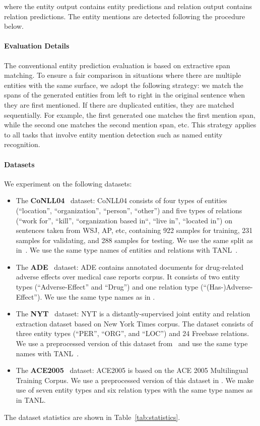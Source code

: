 \noindent where the entity output contains entity predictions and relation output contains relation predictions. The entity mentions are detected following the procedure below.

\paragraph{Evaluation Details} 
The conventional entity prediction evaluation is based on extractive span matching. To ensure a fair comparison in situations where there are multiple entities with the same surface, we adopt the following strategy: we match the spans of the generated entities from left to right in the original sentence when they are first mentioned. If there are duplicated entities, they are matched sequentially. For example, the first generated one matches the first mention span, while the second one matches the second mention span, etc. This strategy applies to all tasks that involve entity mention detection such as named entity recognition.

\paragraph{Datasets}
We experiment on the following datasets:

\begin{itemize}
    \item The {\bf CoNLL04}~\citep{roth-yih-2004-linear} dataset: CoNLL04 consists of four types of entities (``location'', ``organization'', ``person'', ``other'') and five types of relations (``work for'', ``kill'', ``organization based in``, ``live in'', ``located in'') on sentences taken from WSJ, AP, etc, containing 922 samples for training, 231 samples for validating, and 288 samples for testing. We use the same split as in~\cite{gupta-etal-2016-table}. We use the same type names of entities and relations with TANL~\cite{paolini2021structured}.
    \item The {\bf ADE}~\citep{GURULINGAPPA2012885} dataset: ADE contains annotated documents for drug-related adverse effects over medical case reports corpus. It consists of two entity types (``Adverse-Effect'' and ``Drug'') and one relation type (``(Has-)Adverse-Effect''). We use the same type names as in \cite{paolini2021structured}.
    \item The {\bf NYT}~\citep{10.1007/978-3-642-15939-8_10} dataset: NYT is a distantly-supervised joint entity and relation extraction dataset based on New York Times corpus. The dataset consists of three entity types (``PER'', ``ORG'', and ``LOC'') and 24 Freebase relations. We use a preprocessed version of this dataset from~\cite{yu2020jointer} and use the same type names with TANL~\cite{paolini2021structured}.
    \item The {\bf ACE2005}~\citep{walker2005ace} dataset: ACE2005 is based on the ACE 2005 Multilingual Training Corpus. We use a preprocessed version of this dataset in \cite{luan2019general}. We make use of seven entity types and six relation types with the same type names as in TANL.
\end{itemize}
The dataset statistics are shown in Table~\ref{tab:statistics}.

